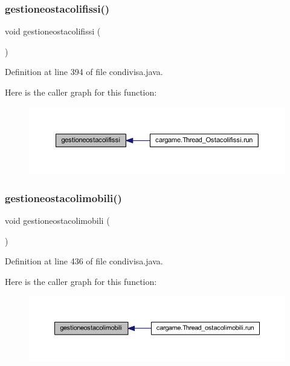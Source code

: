 \subsubsection{\texorpdfstring{gestioneostacolifissi()}{gestioneostacolifissi()}}
{\footnotesize\ttfamily void gestioneostacolifissi (\begin{DoxyParamCaption}{ }\end{DoxyParamCaption})}



Definition at line 394 of file condivisa.\+java.

Here is the caller graph for this function\+:
\nopagebreak
\begin{figure}[H]
\begin{center}
\leavevmode
\includegraphics[width=350pt]{classcargame_1_1condivisa_aa89c1eb296290580066c78298dd31f69_icgraph}
\end{center}
\end{figure}
\mbox{\label{classcargame_1_1condivisa_a043c474a3bfdf39e53cb851da09ea68e}} 
\subsubsection{\texorpdfstring{gestioneostacolimobili()}{gestioneostacolimobili()}}
{\footnotesize\ttfamily void gestioneostacolimobili (\begin{DoxyParamCaption}{ }\end{DoxyParamCaption})}



Definition at line 436 of file condivisa.\+java.

Here is the caller graph for this function\+:
\nopagebreak
\begin{figure}[H]
\begin{center}
\leavevmode
\includegraphics[width=350pt]{classcargame_1_1condivisa_a043c474a3bfdf39e53cb851da09ea68e_icgraph}
\end{center}
\end{figure}
\mbox{\label{classcargame_1_1condivisa_aff555bd79e80391637df4bbe885ff837}} 

